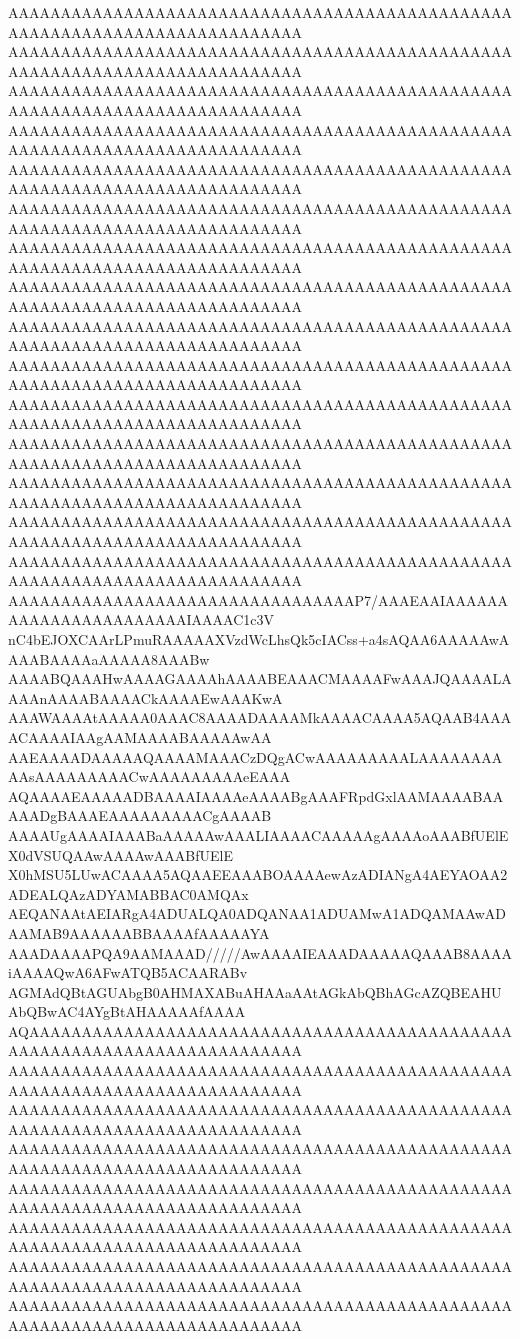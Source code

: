 AAAAAAAAAAAAAAAAAAAAAAAAAAAAAAAAAAAAAAAAAAAAAAAAAAAAAAAAAAAAAAAAAAAAAAAAAAAA
AAAAAAAAAAAAAAAAAAAAAAAAAAAAAAAAAAAAAAAAAAAAAAAAAAAAAAAAAAAAAAAAAAAAAAAAAAAA
AAAAAAAAAAAAAAAAAAAAAAAAAAAAAAAAAAAAAAAAAAAAAAAAAAAAAAAAAAAAAAAAAAAAAAAAAAAA
AAAAAAAAAAAAAAAAAAAAAAAAAAAAAAAAAAAAAAAAAAAAAAAAAAAAAAAAAAAAAAAAAAAAAAAAAAAA
AAAAAAAAAAAAAAAAAAAAAAAAAAAAAAAAAAAAAAAAAAAAAAAAAAAAAAAAAAAAAAAAAAAAAAAAAAAA
AAAAAAAAAAAAAAAAAAAAAAAAAAAAAAAAAAAAAAAAAAAAAAAAAAAAAAAAAAAAAAAAAAAAAAAAAAAA
AAAAAAAAAAAAAAAAAAAAAAAAAAAAAAAAAAAAAAAAAAAAAAAAAAAAAAAAAAAAAAAAAAAAAAAAAAAA
AAAAAAAAAAAAAAAAAAAAAAAAAAAAAAAAAAAAAAAAAAAAAAAAAAAAAAAAAAAAAAAAAAAAAAAAAAAA
AAAAAAAAAAAAAAAAAAAAAAAAAAAAAAAAAAAAAAAAAAAAAAAAAAAAAAAAAAAAAAAAAAAAAAAAAAAA
AAAAAAAAAAAAAAAAAAAAAAAAAAAAAAAAAAAAAAAAAAAAAAAAAAAAAAAAAAAAAAAAAAAAAAAAAAAA
AAAAAAAAAAAAAAAAAAAAAAAAAAAAAAAAAAAAAAAAAAAAAAAAAAAAAAAAAAAAAAAAAAAAAAAAAAAA
AAAAAAAAAAAAAAAAAAAAAAAAAAAAAAAAAAAAAAAAAAAAAAAAAAAAAAAAAAAAAAAAAAAAAAAAAAAA
AAAAAAAAAAAAAAAAAAAAAAAAAAAAAAAAAAAAAAAAAAAAAAAAAAAAAAAAAAAAAAAAAAAAAAAAAAAA
AAAAAAAAAAAAAAAAAAAAAAAAAAAAAAAAAAAAAAAAAAAAAAAAAAAAAAAAAAAAAAAAAAAAAAAAAAAA
AAAAAAAAAAAAAAAAAAAAAAAAAAAAAAAAAAAAAAAAAAAAAAAAAAAAAAAAAAAAAAAAAAAAAAAAAAAA
AAAAAAAAAAAAAAAAAAAAAAAAAAAAAAAAAP7/AAAEAAIAAAAAAAAAAAAAAAAAAAAAAAIAAAAC1c3V
nC4bEJOXCAArLPmuRAAAAAXVzdWcLhsQk5cIACss+a4sAQAA6AAAAAwAAAABAAAAaAAAAA8AAABw
AAAABQAAAHwAAAAGAAAAhAAAABEAAACMAAAAFwAAAJQAAAALAAAAnAAAABAAAACkAAAAEwAAAKwA
AAAWAAAAtAAAAA0AAAC8AAAADAAAAMkAAAACAAAA5AQAAB4AAAACAAAAIAAgAAMAAAABAAAAAwAA
AAEAAAADAAAAAQAAAAMAAACzDQgACwAAAAAAAAALAAAAAAAAAAsAAAAAAAAACwAAAAAAAAAeEAAA
AQAAAAEAAAAADBAAAAIAAAAeAAAABgAAAFRpdGxlAAMAAAABAAAAADgBAAAEAAAAAAAAACgAAAAB
AAAAUgAAAAIAAABaAAAAAwAAALIAAAACAAAAAgAAAAoAAABfUElEX0dVSUQAAwAAAAwAAABfUElE
X0hMSU5LUwACAAAA5AQAAEEAAABOAAAAewAzADIANgA4AEYAOAA2ADEALQAzADYAMABBAC0AMQAx
AEQANAAtAEIARgA4ADUALQA0ADQANAA1ADUAMwA1ADQAMAAwADAAMAB9AAAAAABBAAAAfAAAAAYA
AAADAAAAPQA9AAMAAAD/////AwAAAAIEAAADAAAAAQAAAB8AAAAiAAAAQwA6AFwATQB5ACAARABv
AGMAdQBtAGUAbgB0AHMAXABuAHAAaAAtAGkAbQBhAGcAZQBEAHUAbQBwAC4AYgBtAHAAAAAfAAAA
AQAAAAAAAAAAAAAAAAAAAAAAAAAAAAAAAAAAAAAAAAAAAAAAAAAAAAAAAAAAAAAAAAAAAAAAAAAA
AAAAAAAAAAAAAAAAAAAAAAAAAAAAAAAAAAAAAAAAAAAAAAAAAAAAAAAAAAAAAAAAAAAAAAAAAAAA
AAAAAAAAAAAAAAAAAAAAAAAAAAAAAAAAAAAAAAAAAAAAAAAAAAAAAAAAAAAAAAAAAAAAAAAAAAAA
AAAAAAAAAAAAAAAAAAAAAAAAAAAAAAAAAAAAAAAAAAAAAAAAAAAAAAAAAAAAAAAAAAAAAAAAAAAA
AAAAAAAAAAAAAAAAAAAAAAAAAAAAAAAAAAAAAAAAAAAAAAAAAAAAAAAAAAAAAAAAAAAAAAAAAAAA
AAAAAAAAAAAAAAAAAAAAAAAAAAAAAAAAAAAAAAAAAAAAAAAAAAAAAAAAAAAAAAAAAAAAAAAAAAAA
AAAAAAAAAAAAAAAAAAAAAAAAAAAAAAAAAAAAAAAAAAAAAAAAAAAAAAAAAAAAAAAAAAAAAAAAAAAA
AAAAAAAAAAAAAAAAAAAAAAAAAAAAAAAAAAAAAAAAAAAAAAAAAAAAAAAAAAAAAAAAAAAAAAAAAAAA
